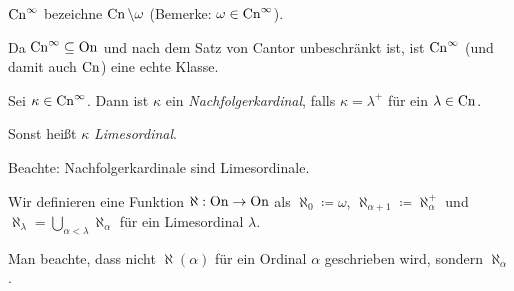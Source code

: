 \begin{definition}
	$\operatorname{Cn}^\infty$ bezeichne $\operatorname{Cn}\setminus\omega$ (Bemerke: $\omega\in \operatorname{Cn}^\infty$).
\end{definition}

Da $\operatorname{Cn}^\infty\subseteq \operatorname{On}$ und nach dem Satz von Cantor unbeschränkt ist, ist $\operatorname{Cn}^\infty$ (und damit auch $\operatorname{Cn}$) eine echte Klasse.

\begin{definition}
	Sei $\kappa\in \operatorname{Cn}^\infty$. Dann ist $\kappa$ ein \textit{Nachfolgerkardinal}, falls $\kappa=\lambda^+$ für ein $\lambda\in \operatorname{Cn}$.
	
	Sonst heißt $\kappa$ \textit{Limesordinal}.
\end{definition}

Beachte: Nachfolgerkardinale sind Limesordinale.

\begin{definition}
	Wir definieren eine Funktion $\aleph:\operatorname{On}\to \operatorname{On}$ als $\aleph_0\coloneqq\omega$, $\aleph_{\alpha+1}\coloneqq \aleph_\alpha^+$ und $\aleph_\lambda=\bigcup_{\alpha<\lambda}\aleph_\alpha$ für ein Limesordinal $\lambda$. 
\end{definition}

Man beachte, dass nicht $\aleph(\alpha)$ für ein Ordinal $\alpha$ geschrieben wird, sondern $\aleph_\alpha$.

